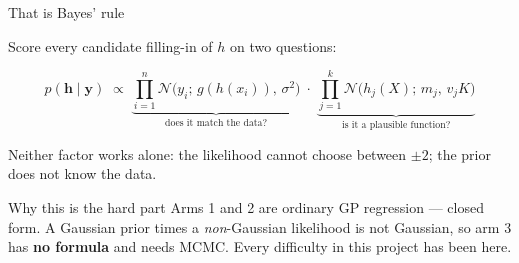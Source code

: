 \documentclass[aspectratio=169,11pt]{beamer}
\newcommand{\Norm}{\mathcal{N}}
\begin{document}
\begin{frame}{That is Bayes' rule}

Score every candidate filling-in of $h$ on two questions:

\begin{equation*}
p(\mathbf h \mid \mathbf y)\;\propto\;
\underbrace{\prod_{i=1}^{n}\Norm\bigl(y_i;\,g(h(x_i)),\,\sigma^2\bigr)}_{\text{does it match the data?}}
\;\cdot\;
\underbrace{\prod_{j=1}^{k}\Norm\bigl(h_j(X);\,m_j,\,v_jK\bigr)}_{\text{is it a plausible function?}}
\end{equation*}

\bigskip
Neither factor works alone: the likelihood cannot choose between $\pm2$; the
prior does not know the data.

\bigskip
\begin{alertblock}{Why this is the hard part}
Arms 1 and 2 are ordinary GP regression --- closed form.
A Gaussian prior times a \emph{non}-Gaussian likelihood is not Gaussian, so arm 3
has \textbf{no formula} and needs MCMC. Every difficulty in this project has
been here.
\end{alertblock}

\end{frame}
\end{document}
